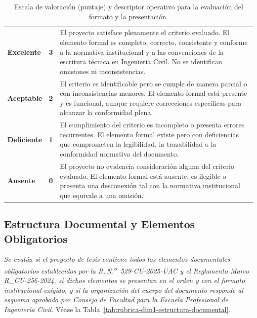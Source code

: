 \vspace{-10pt}
\begin{table}[htbp]
\centering
\scriptsize
\caption{Escala de valoración (puntaje) y descriptor operativo para la evaluación del formato y la presentación.}
\label{tab:escala-formato}
\begin{tabularx}{\textwidth}{|C{2.8cm}|C{1cm}|X|}
\hline
{}
 &  &  \\ \hline
\textcolor{csuf}{\textbf{Excelente}} & \textbf{3} & El proyecto satisface plenamente el criterio evaluado. El elemento formal es completo, correcto, consistente y conforme a la normativa institucional y a las convenciones de la escritura técnica en Ingeniería Civil. No se identifican omisiones ni inconsistencias. \\ \hline
{}
\textcolor{cace}{\textbf{Aceptable}} & \textbf{2} & El criterio es identificable pero se cumple de manera parcial o con inconsistencias menores. El elemento formal está presente y es funcional, aunque requiere correcciones específicas para alcanzar la conformidad plena. \\ \hline
\textcolor{cdef}{\textbf{Deficiente}} & \textbf{1} & El cumplimiento del criterio es incompleto o presenta errores recurrentes. El elemento formal existe pero con deficiencias que comprometen la legibilidad, la trazabilidad o la conformidad normativa del documento. \\ \hline
{}
\textcolor{cins}{\textbf{Ausente}} & \textbf{0} & El proyecto no evidencia consideración alguna del criterio evaluado. El elemento formal está ausente, es ilegible o presenta una desconexión tal con la normativa institucional que equivale a una omisión. \\ \hline
\end{tabularx}
\end{table}

\clearpage
\subsection{Estructura Documental y Elementos Obligatorios}

\textit{Se evalúa si el proyecto de tesis contiene todos los elementos documentales obligatorios establecidos por la R.\,N.\textsuperscript{o}~529-CU-2025-UAC y el Reglamento Marco R\_CU-256-2024, si dichos elementos se presentan en el orden y con el formato institucional exigido, y si la organización del cuerpo del documento responde al esquema aprobado por Consejo de Facultad para la Escuela Profesional de Ingeniería Civil.} Véase la Tabla~\ref{tab:rubrica-dim1-estructura-documental}.


